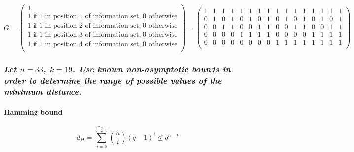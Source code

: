 \documentclass[11pt]{article}
\begin{document}
\begin{equation}
G=
\begin{pmatrix}
1\\
\text{1 if 1 in position 1 of information set, 0 otherwise}\\
\text{1 if 1 in position 2 of information set, 0 otherwise}\\
\text{1 if 1 in position 3 of information set, 0 otherwise}\\
\text{1 if 1 in position 4 of information set, 0 otherwise}\\
\end{pmatrix}
=
\begin{pmatrix}
1 & 1 & 1 & 1 & 1 & 1 & 1 & 1 & 1 & 1 & 1 & 1 & 1 & 1 & 1 & 1 \\
0 & 1 & 0 & 1 & 0 & 1 & 0 & 1 & 0 & 1 & 0 & 1 & 0 & 1 & 0 & 1 \\
0 & 0 & 1 & 1 & 0 & 0 & 1 & 1 & 0 & 0 & 1 & 1 & 0 & 0 & 1 & 1 \\
0 & 0 & 0 & 0 & 1 & 1 & 1 & 1 & 0 & 0 & 0 & 0 & 1 & 1 & 1 & 1 \\
0 & 0 & 0 & 0 & 0 & 0 & 0 & 0 & 1 & 1 & 1 & 1 & 1 & 1 & 1 & 1 \\
\end{pmatrix}
\end{equation}

    \hypertarget{let-n-33-k-19.-use-known-non-asymptotic-bounds-in-order-to-determine-the-range-of-possible-values-of-the-minimum-distance.}{%
\subsubsection{\texorpdfstring{\emph{Let \(n = 33\), \(k = 19\). Use
known non-asymptotic bounds in order to determine the range of possible
values of the minimum
distance.}}{Let n = 33, k = 19. Use known non-asymptotic bounds in order to determine the range of possible values of the minimum distance.}}\label{let-n-33-k-19.-use-known-non-asymptotic-bounds-in-order-to-determine-the-range-of-possible-values-of-the-minimum-distance.}}

    \hypertarget{hamming-bound}{%
\paragraph{Hamming bound}\label{hamming-bound}}

\[d_H = ∑_{i = 0}^{⌊\frac{d - 1}{2}⌋}\binom{n}{i}(q - 1)^i≤q^{n - k}\]
\end{document}
